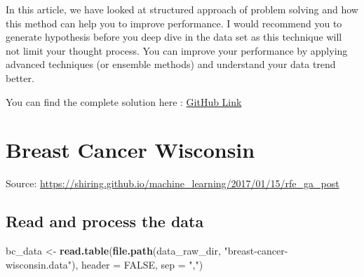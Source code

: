 \documentclass[]{book}
\newenvironment{Shaded}{\begin{snugshade}}{\end{snugshade}}
\newcommand{\CommentTok}[1]{\textcolor[rgb]{0.56,0.35,0.01}{\textit{#1}}}
\newcommand{\DataTypeTok}[1]{\textcolor[rgb]{0.13,0.29,0.53}{#1}}
\newcommand{\KeywordTok}[1]{\textcolor[rgb]{0.13,0.29,0.53}{\textbf{#1}}}
\newcommand{\NormalTok}[1]{#1}
\newcommand{\OperatorTok}[1]{\textcolor[rgb]{0.81,0.36,0.00}{\textbf{#1}}}
\newcommand{\OtherTok}[1]{\textcolor[rgb]{0.56,0.35,0.01}{#1}}
\newcommand{\StringTok}[1]{\textcolor[rgb]{0.31,0.60,0.02}{#1}}
\begin{document}
In this article, we have looked at structured approach of problem solving and how this method can help you to improve performance. I would recommend you to generate hypothesis before you deep dive in the data set as this technique will not limit your thought process. You can improve your performance by applying advanced techniques (or ensemble methods) and understand your data trend better.

You can find the complete solution here : \href{https://github.com/adityashrm21/Kaggle/blob/master/Bike_Sharing_Demand.R}{GitHub Link}

\begin{Shaded}
\end{Shaded}

\hypertarget{breast-cancer-wisconsin}{%
\chapter{Breast Cancer Wisconsin}\label{breast-cancer-wisconsin}}

Source: \url{https://shiring.github.io/machine_learning/2017/01/15/rfe_ga_post}

\hypertarget{read-and-process-the-data}{%
\section{Read and process the data}\label{read-and-process-the-data}}

\begin{Shaded}
\begin{Highlighting}[]
\NormalTok{bc_data <-}\StringTok{ }\KeywordTok{read.table}\NormalTok{(}\KeywordTok{file.path}\NormalTok{(data_raw_dir, }\StringTok{"breast-cancer-wisconsin.data"}\NormalTok{), }
                      \DataTypeTok{header =} \OtherTok{FALSE}\NormalTok{, }\DataTypeTok{sep =} \StringTok{","}\NormalTok{)}
\end{Highlighting}
\end{Shaded}
\end{document}
